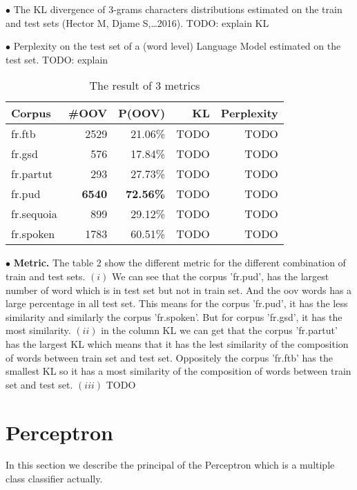 \documentclass{article}
\begin{document}
$\bullet$ The KL divergence of 3-grams characters distributions estimated on the train and test sets (Hector M, Djame S,\dots 2016). TODO: explain KL

$\bullet$ Perplexity on the test set of a (word level) Language Model estimated on the test set. TODO: explain

\begin{table}[h]
    \caption{The result of 3 metrics}
    \vspace{5pt}
    \centering
    
\begin{tabular}{|l|rr|r|r|}
\hline
Corpus & \#OOV & P(OOV) & KL & Perplexity\\
\hline
fr.ftb     & 2529 & 21.06\% & TODO & TODO \\
fr.gsd     & 576 & 17.84\% & TODO  & TODO\\
fr.partut  & 293   & 27.73\%  & TODO  & TODO\\
fr.pud     & \textbf{6540}   & \textbf{72.56\%}  & TODO & TODO\\
fr.sequoia & 899  & 29.12\%  &  TODO & TODO\\
fr.spoken  & 1783  & 60.51\%  & TODO  &TODO \\
\hline
\end{tabular}
\label{table_matric}
\end{table}

$\bullet$ \textbf{Metric.} The table 2 show the different metric for the different combination of train and test sets. $(i)$ We can see that the corpus 'fr.pud', has the largest number of word which is in test set but not in train set. And the oov words has a large percentage in all test set. This means for the corpus 'fr.pud', it has the less similarity and similarly the corpus 'fr.spoken'. But for corpus 'fr.gsd', it has the most similarity. $(ii)$ in the column KL we can get that the corpus 'fr.partut' has the largest KL which means that it has the lest similarity of the composition of words between train set and test set. Oppositely the corpus 'fr.ftb' has the smallest KL so it has a most similarity of the composition of words between train set and test set. $(iii)$ TODO



\section{Perceptron}
In this section we describe the principal of the Perceptron which is a multiple class classifier actually.
\end{document}
